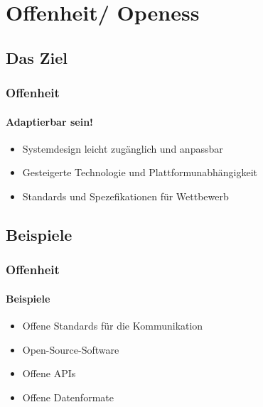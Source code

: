 \section{Offenheit/ Openess}
\subsection{Das Ziel}
\begin{frame}
  \frametitle{Offenheit}
  \framesubtitle{Adaptierbar sein!}
  \begin{itemize}
    \item Systemdesign leicht zugänglich und anpassbar
    \item Gesteigerte Technologie und Plattformunabhängigkeit
    \item Standards und Spezefikationen für Wettbewerb
  \end{itemize}
\end{frame}

\subsection{Beispiele}
\begin{frame}
  \frametitle{Offenheit}
  \framesubtitle{Beispiele}
  \begin{itemize}
    \item Offene Standards für die Kommunikation
    \item Open-Source-Software
    \item Offene APIs
    \item Offene Datenformate
  \end{itemize}
\end{frame}
